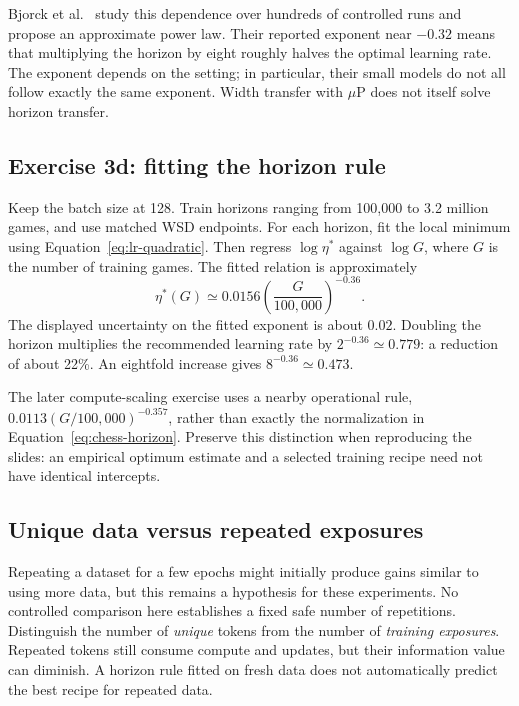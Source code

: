 Bjorck et al.~\cite{horizon} study this dependence over hundreds of controlled runs and propose an approximate power law. Their reported exponent near $-0.32$ means that multiplying the horizon by eight roughly halves the optimal learning rate. The exponent depends on the setting; in particular, their small models do not all follow exactly the same exponent. Width transfer with $\mu$P does not itself solve horizon transfer.


\subsection{Exercise 3d: fitting the horizon rule}
Keep the batch size at 128. Train horizons ranging from 100,000 to 3.2 million games, and use matched WSD endpoints. For each horizon, fit the local minimum using Equation~\eqref{eq:lr-quadratic}. Then regress $\log\eta^*$ against $\log G$, where $G$ is the number of training games. The fitted relation is approximately
\begin{equation}
\boxed{\eta^*(G)\simeq 0.0156\left(\frac{G}{100{,}000}\right)^{-0.36}}.
\label{eq:chess-horizon}
\end{equation}
The displayed uncertainty on the fitted exponent is about $0.02$. Doubling the horizon multiplies the recommended learning rate by $2^{-0.36}\simeq0.779$: a reduction of about 22\%. An eightfold increase gives $8^{-0.36}\simeq0.473$.


The later compute-scaling exercise uses a nearby operational rule, $0.0113(G/100{,}000)^{-0.357}$, rather than exactly the normalization in Equation~\eqref{eq:chess-horizon}. Preserve this distinction when reproducing the slides: an empirical optimum estimate and a selected training recipe need not have identical intercepts.

\subsection{Unique data versus repeated exposures}
Repeating a dataset for a few epochs might initially produce gains similar to using more data, but this remains a hypothesis for these experiments. No controlled comparison here establishes a fixed safe number of repetitions. Distinguish the number of \emph{unique} tokens from the number of \emph{training exposures}. Repeated tokens still consume compute and updates, but their information value can diminish. A horizon rule fitted on fresh data does not automatically predict the best recipe for repeated data.

